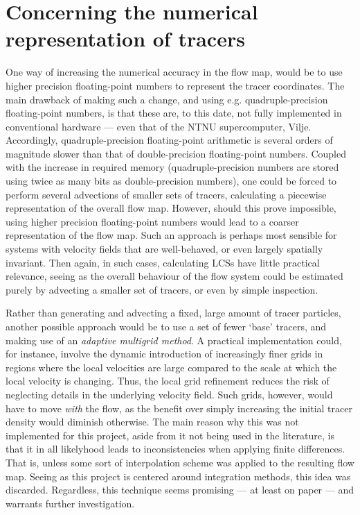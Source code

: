 \section{Concerning the numerical representation of tracers}
\label{sec:concerning_the_numerical_representation_of_tracers}

One way of increasing the numerical accuracy in the flow map, would be
to use higher precision floating-point numbers to represent the tracer
coordinates. The main drawback of making such a change, and using e.g.
quadruple-precision floating-point numbers, is that these are, to this date,
not fully implemented in conventional hardware --- even that of the NTNU
supercomputer, Vilje. Accordingly, quadruple-precision floating-point
arithmetic is several orders of magnitude slower than that of double-precision
floating-point numbers. Coupled with the increase in required memory
(quadruple-precision numbers are stored using twice as many bits as
double-precision numbers), one could be forced to perform several
advections of smaller sets of tracers, calculating a piecewise representation
of the overall flow map. However, should this prove impossible, using higher
precision floating-point numbers would lead to a coarser representation
of the flow map. Such an approach is perhaps most sensible for systems with
velocity fields that are well-behaved, or even largely spatially invariant.
Then again, in such cases, calculating LCSs have little practical relevance,
seeing as the overall behaviour of the flow system could be estimated purely by
advecting a smaller set of tracers, or even by simple inspection.

Rather than generating and advecting a fixed, large amount of tracer particles,
another possible approach would be to use a set of fewer `base' tracers, and
making use of an \emph{adaptive multigrid method}. A practical implementation
could, for instance, involve the dynamic introduction of increasingly finer
grids in regions where the local velocities are large compared to the scale at
which the local velocity is changing. Thus, the local grid refinement reduces
the risk of neglecting details in the underlying velocity field. Such grids,
however, would have to move \emph{with} the flow, as the benefit over simply
increasing the initial tracer density would diminish otherwise. The main reason
why this was not implemented for this project, aside from it not being used in
the literature, is that it in all likelyhood leads to inconsistencies when
applying finite differences. That is, unless some sort of interpolation scheme
was applied to the resulting flow map. Seeing as this project is centered around
integration methods, this idea was discarded. Regardless, this technique seems
promising --- at least on paper --- and warrants further investigation.
%
